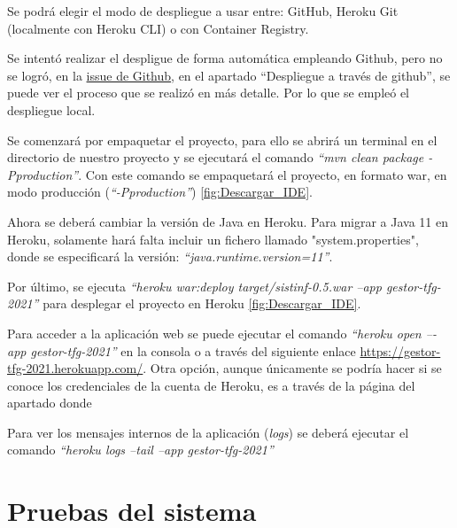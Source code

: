
Se podrá elegir el modo de despliegue a usar entre: GitHub, Heroku Git (localmente con Heroku CLI) o con Container Registry.


Se intentó realizar el despligue de forma automática empleando Github, pero no se logró, en la \href{https://github.com/dbo1001/Gestor-TFG-2021/issues/112}{issue de Github}, en el apartado ``Despliegue a través de github'', se puede ver el proceso que se realizó en más detalle. Por lo que se empleó el despliegue local. 

Se comenzará por empaquetar el proyecto, para ello se abrirá un terminal en el directorio de nuestro proyecto y se ejecutará el comando \emph{``mvn clean package -Pproduction''}. Con este comando se empaquetará el proyecto, en formato war, en modo producción (\emph{``-Pproduction''}) \ref{fig:Descargar_IDE}.


Ahora se deberá cambiar la versión de Java en Heroku. Para migrar a Java 11 en Heroku, solamente hará falta incluir un fichero llamado "system.properties", donde se especificará la versión: \emph{``java.runtime.version=11''}.

Por último, se ejecuta \emph{``heroku war:deploy target/sistinf-0.5.war --app gestor-tfg-2021''} para desplegar el proyecto en Heroku \ref{fig:Descargar_IDE}. 


Para acceder a la aplicación web se puede ejecutar el comando \emph{“heroku open –-app gestor-tfg-2021”} en la consola o a través del siguiente enlace \href{https://gestor-tfg-2021.herokuapp.com/}{https://gestor-tfg-2021.herokuapp.com/}. Otra opción, aunque únicamente se podría hacer si se conoce los credenciales de la cuenta de Heroku, es a través de la página del apartado donde 

Para ver los mensajes internos de la aplicación (\emph{logs}) se deberá ejecutar el comando \emph{``heroku logs --tail --app gestor-tfg-2021''}

\section{Pruebas del sistema}

